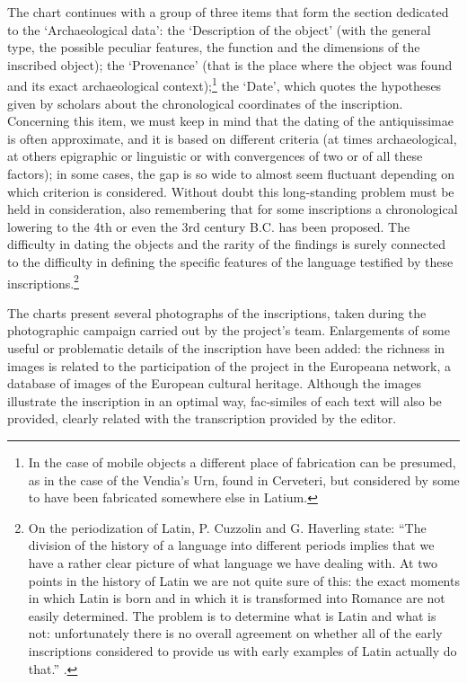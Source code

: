\documentclass[amsthm,ebook]{saparticle}
\begin{document}
The chart continues with a group of three items that form the section dedicated to the `Archaeological data': the
‘Description of the object' (with the general type, the possible peculiar features, the function and the dimensions of
the inscribed object); the ‘Provenance' (that is the place where the object was found and its exact archaeological
context);\footnote{In the case of mobile objects a different place of fabrication can be presumed, as in the case of the
Vendia's Urn, found in Cerveteri, but considered by some to have been fabricated somewhere else in Latium.} the
‘Date', which quotes the hypotheses given by scholars about the chronological coordinates of the inscription.
Concerning this item, we must keep in mind that the dating of the antiquissimae is often approximate, and it is based
on different criteria (at times archaeological, at others epigraphic or linguistic or with convergences of two or of
all these factors); in some cases, the gap is so wide to almost seem fluctuant depending on which criterion is
considered. Without doubt this long-standing problem must be held in consideration, also remembering that for some
inscriptions a chronological lowering to the 4th or even the 3rd century B.C. has been proposed. The difficulty in
dating the objects and the rarity of the findings is surely connected to the difficulty in defining the specific
features of the language testified by these inscriptions.\footnote{On the periodization of Latin, P. Cuzzolin and G.
Haverling state: “The division of the history of a language into different periods implies that we have a rather clear
picture of what language we have dealing with. At two points in the history of Latin we are not quite sure of this: the
exact moments in which Latin is born and in which it is transformed into Romance are not easily determined. The problem
is to determine what is Latin and what is not: unfortunately there is no overall agreement on whether all of the early
inscriptions considered to provide us with early examples of Latin actually do that.” \citep[20]{cuzzolin_syntax_2009}.}

The charts present several photographs of the inscriptions, taken during the photographic campaign carried out by the
project's team. Enlargements of some useful or problematic details of the inscription have been added: the richness in
images is related to the participation of the project in the Europeana network, a database of images of the European
cultural heritage. Although the images illustrate the inscription in an optimal way, fac-similes of each text will also
be provided, clearly related with the transcription provided by the editor. 
\end{document}
